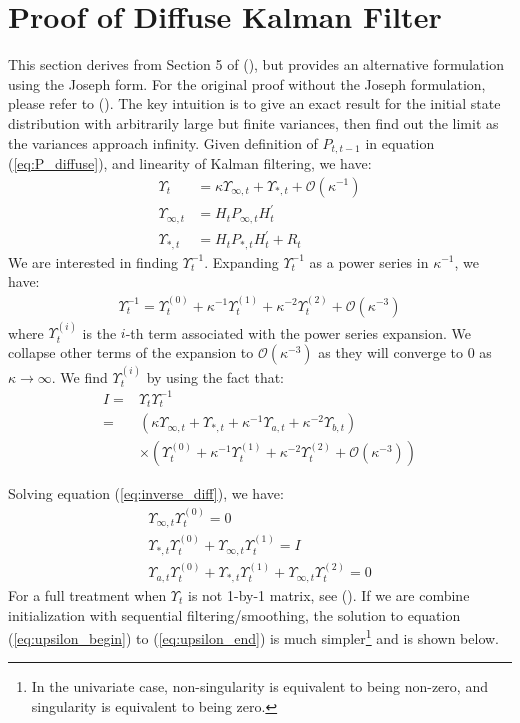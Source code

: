 \documentclass[12pt]{article}
\numberwithin{equation}{section}
\begin{document}
\section{Proof of Diffuse Kalman Filter} \label{ap:init_filter}
This section derives from Section 5 of (\cite{durbin_koopman_2001}), but provides an alternative formulation using the Joseph form. For the original proof without the Joseph formulation, please refer to (\cite{durbin_koopman_2001}). The key intuition is to give an exact result for the initial state distribution with arbitrarily large but finite variances, then find out the limit as the variances approach infinity. Given definition of $P_{t,t-1}$ in equation (\ref{eq:P_diffuse}), and linearity of Kalman filtering, we have:
\begin{align*}
    \Upsilon_t &= \kappa \Upsilon_{\infty,t} + \Upsilon_{*,t} + \mathcal{O}(\kappa^{-1}) \\
    \Upsilon_{\infty,t} &= H_tP_{\infty,t}H_t^{'} \\ 
    \Upsilon_{*,t} &= H_tP_{*,t}H_t^{'} + R_t
\end{align*}
We are interested in finding $\Upsilon_t^{-1}$. Expanding $\Upsilon_t^{-1}$ as a power series in $\kappa^{-1}$, we have:
\begin{align*}
    \Upsilon_t^{-1} = \Upsilon_t^{(0)} + \kappa^{-1}\Upsilon_t^{(1)} + \kappa^{-2}\Upsilon_t^{(2)}+\mathcal{O}(\kappa^{-3})
\end{align*}
where $\Upsilon_t^{(i)}$ is the $i$-th term associated with the power series expansion. We collapse other terms of the expansion to $\mathcal{O}(\kappa^{-3})$ as they will converge to 0 as $\kappa \rightarrow \infty$. We find $\Upsilon_t^{(i)}$ by using the fact that: 
\begin{align}
    I =& \Upsilon_t\Upsilon_t^{-1} \nonumber \\
    =& (\kappa \Upsilon_{\infty,t} + \Upsilon_{*,t} + \kappa^{-1}\Upsilon_{a,t} + \kappa^{-2}\Upsilon_{b,t}) \label{eq:inverse_diff}
 \\
    &\times (\Upsilon_t^{(0)} + \kappa^{-1}\Upsilon_t^{(1)} + \kappa^{-2}\Upsilon_t^{(2)}+\mathcal{O}(\kappa^{-3})) \nonumber
\end{align}

Solving equation (\ref{eq:inverse_diff}), we have:
\begin{align}
    \Upsilon_{\infty,t}\Upsilon_t^{(0)} = 0 \label{eq:upsilon_begin} \\
    \Upsilon_{*,t}\Upsilon_t^{(0)} + \Upsilon_{\infty,t}\Upsilon_t^{(1)} = I \\
    \Upsilon_{a,t}\Upsilon_t^{(0)} + \Upsilon_{*,t}\Upsilon_t^{(1)} + \Upsilon_{\infty,t}\Upsilon_t^{(2)} = 0 \label{eq:upsilon_end}
\end{align}
For a full treatment when $\Upsilon_t$ is not 1-by-1 matrix, see (\cite{koopman_1997}). If we are combine initialization with sequential filtering/smoothing, the solution to equation (\ref{eq:upsilon_begin}) to (\ref{eq:upsilon_end}) is much simpler\footnote{In the univariate case, non-singularity is equivalent to being non-zero, and singularity is equivalent to being zero.} and is shown below.
\end{document}
